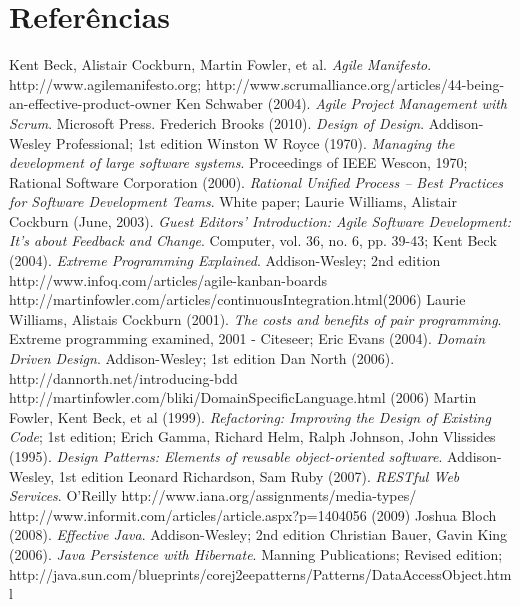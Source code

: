 \section{Referências}

\begin{thebibliography}{30} 

 Kent Beck, Alistair Cockburn, Martin Fowler, et al. \textit{Agile Manifesto}. http://www.agilemanifesto.org;
 http://www.scrumalliance.org/articles/44-being-an-effective-product-owner
 Ken Schwaber (2004). \textit{Agile Project Management with Scrum}. Microsoft Press.
 Frederich Brooks (2010). \textit{Design of Design}. Addison-Wesley Professional; 1st edition
 Winston W Royce (1970). \textit{Managing the development of large software systems}.
Proceedings of IEEE Wescon, 1970;
 Rational Software Corporation (2000). \textit{Rational Unified Process -- Best Practices for Software Development Teams}. White paper;
 Laurie Williams, Alistair Cockburn (June, 2003). \textit{Guest Editors' Introduction: Agile Software Development: It's about Feedback and Change}. Computer, vol. 36, no. 6, pp. 39-43;
 Kent Beck (2004). \textit{Extreme Programming Explained}. Addison-Wesley; 2nd edition
 http://www.infoq.com/articles/agile-kanban-boards
 http://martinfowler.com/articles/continuousIntegration.html(2006)
 Laurie Williams, Alistais Cockburn (2001). \textit{The costs and benefits of pair programming}. Extreme programming examined, 2001 - Citeseer;
 Eric Evans (2004). \textit{Domain Driven Design}. Addison-Wesley; 1st edition
 Dan North (2006). http://dannorth.net/introducing-bdd
 http://martinfowler.com/bliki/DomainSpecificLanguage.html (2006)
 Martin Fowler, Kent Beck, et al (1999). \textit{Refactoring: Improving the Design of Existing Code}; 1st edition;
 Erich Gamma, Richard Helm, Ralph Johnson, John Vlissides (1995). \textit{Design Patterns: Elements of reusable object-oriented software}. Addison-Wesley, 1st edition
 Leonard Richardson, Sam Ruby (2007). \textit{RESTful Web Services}. O'Reilly
 http://www.iana.org/assignments/media-types/
 http://www.informit.com/articles/article.aspx?p=1404056 (2009)
 Joshua Bloch (2008). \textit{Effective Java}. Addison-Wesley; 2nd edition
 Christian Bauer, Gavin King (2006). \textit{Java Persistence with Hibernate}. Manning Publications; Revised edition;
 http://java.sun.com/blueprints/corej2eepatterns/Patterns/DataAccessObject.html


\end{thebibliography}
